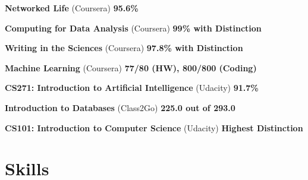 \documentclass[margin,line]{resume}
\begin{document}
\begin{resume}
    \begin{list2}
	\item \textbf{Networked Life} (Coursera) \hspace{104mm} \textbf{95.6\%}
	\end{list2}
    
    \begin{list2}
	\item \textbf{Computing for Data Analysis} (Coursera) \hspace{52mm} \textbf{99\% with Distinction}
	\end{list2}

    \begin{list2}
	\item \textbf{Writing in the Sciences} (Coursera) \hspace{60mm} \textbf{97.8\% with Distinction}
	\end{list2}
    
    \begin{list2}
	\item \textbf{Machine Learning} (Coursera) \hspace{54mm} \textbf{77/80 (HW), 800/800 (Coding)}
	\end{list2}
    
    \begin{list2}
	\item \textbf{CS271: Introduction to Artificial Intelligence} (Udacity) \hspace{52mm} \textbf{91.7\%}
	\end{list2}
    
    \begin{list2}
	\item \textbf{Introduction to Databases} (Class2Go) \hspace{64mm} \textbf{225.0 out of 293.0}
    \end{list2}

    \begin{list2}
	\item \textbf{CS101: Introduction to Computer Science} (Udacity) \hspace{34mm} \textbf{Highest Distinction}
	\end{list2}

    \section{\mysidestyle Skills} 


\end{resume}
\end{document}
